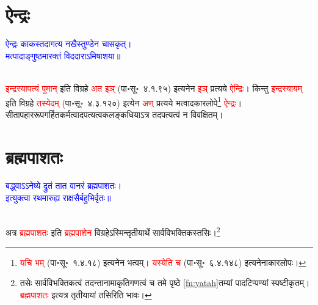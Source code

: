 \section[ऐन्द्रः]{ऐन्द्रः}
\centering\textcolor{blue}{ऐन्द्रः काकस्तदागत्य नखैस्तुण्डेन चासकृत्।\nopagebreak\\
मत्पादाङ्गुष्ठमारक्तं विददाराऽमिषाशया॥}\nopagebreak\\
\\
\begin{sloppypar}\justifying\noindent\hspace{10mm} \textcolor{red}{इन्द्रस्यापत्यं पुमान्} इति विग्रहे \textcolor{red}{अत इञ्} (पा॰सू॰~४.१.९५) इत्यनेन \textcolor{red}{इञ्} प्रत्यये \textcolor{red}{ऐन्द्रिः}। किन्तु \textcolor{red}{इन्द्रस्यायम्} इति विग्रहे \textcolor{red}{तस्येदम्} (पा॰सू॰~४.३.१२०) इत्येन \textcolor{red}{अण्} प्रत्यये भत्वादकार\-लोपे\footnote{\textcolor{red}{यचि भम्} (पा॰सू॰~१.४.१८) इत्यनेन भत्वम्। \textcolor{red}{यस्येति च} (पा॰सू॰~६.४.१४८) इत्यनेनाकार\-लोपः।} \textcolor{red}{ऐन्द्रः}। सीतापहार\-रूप\-गर्हित\-कर्मत्वादपत्यत्व\-कलङ्क\-धियाऽत्र तदपत्यत्वं न विवक्षितम्।\end{sloppypar}
\section[ब्रह्मपाशतः]{ब्रह्मपाशतः}
\centering\textcolor{blue}{बद्ध्वाऽऽनेष्ये द्रुतं तात वानरं ब्रह्मपाशतः।\nopagebreak\\
इत्युक्त्वा रथमारुह्य राक्षसैर्बहुभिर्वृतः॥}\nopagebreak\\
\\
\begin{sloppypar}\justifying\noindent\hspace{10mm} अत्र \textcolor{red}{ब्रह्म\-पाशतः} इति \textcolor{red}{ब्रह्मपाशेन} विग्रहेऽस्मिन्तृतीयार्थे सार्वविभक्तिकस्तसिः।\footnote{तसेः सार्व\-विभक्तिकत्वं तदन्तानामाकृति\-गणत्वं च \pageref{fn:yatah}तमे पृष्ठे \ref{fn:yatah}तम्यां पादटिप्पण्यां स्पष्टीकृतम्।
\textcolor{red}{ब्रह्मपाशतः} इत्यत्र तृतीयायां तसिरिति भावः।}\end{sloppypar}
